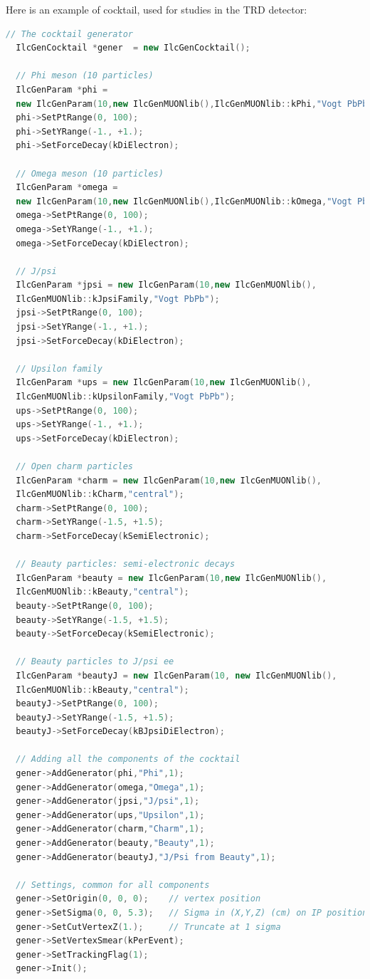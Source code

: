 \documentclass[12pt,a4paper,twoside]{article}
\begin{document}
Here is an example of cocktail, used for studies in the TRD detector:

\begin{lstlisting}[language=C++]
  // The cocktail generator
  IlcGenCocktail *gener  = new IlcGenCocktail();
  
  // Phi meson (10 particles)
  IlcGenParam *phi = 
  new IlcGenParam(10,new IlcGenMUONlib(),IlcGenMUONlib::kPhi,"Vogt PbPb");
  phi->SetPtRange(0, 100);
  phi->SetYRange(-1., +1.);
  phi->SetForceDecay(kDiElectron);

  // Omega meson (10 particles)
  IlcGenParam *omega = 
  new IlcGenParam(10,new IlcGenMUONlib(),IlcGenMUONlib::kOmega,"Vogt PbPb");
  omega->SetPtRange(0, 100);
  omega->SetYRange(-1., +1.);
  omega->SetForceDecay(kDiElectron);
  
  // J/psi 
  IlcGenParam *jpsi = new IlcGenParam(10,new IlcGenMUONlib(),
  IlcGenMUONlib::kJpsiFamily,"Vogt PbPb");
  jpsi->SetPtRange(0, 100);
  jpsi->SetYRange(-1., +1.);
  jpsi->SetForceDecay(kDiElectron);

  // Upsilon family
  IlcGenParam *ups = new IlcGenParam(10,new IlcGenMUONlib(),
  IlcGenMUONlib::kUpsilonFamily,"Vogt PbPb");
  ups->SetPtRange(0, 100);
  ups->SetYRange(-1., +1.);
  ups->SetForceDecay(kDiElectron);
  
  // Open charm particles
  IlcGenParam *charm = new IlcGenParam(10,new IlcGenMUONlib(), 
  IlcGenMUONlib::kCharm,"central");
  charm->SetPtRange(0, 100);
  charm->SetYRange(-1.5, +1.5);
  charm->SetForceDecay(kSemiElectronic);

  // Beauty particles: semi-electronic decays
  IlcGenParam *beauty = new IlcGenParam(10,new IlcGenMUONlib(), 
  IlcGenMUONlib::kBeauty,"central");
  beauty->SetPtRange(0, 100);
  beauty->SetYRange(-1.5, +1.5);
  beauty->SetForceDecay(kSemiElectronic);

  // Beauty particles to J/psi ee
  IlcGenParam *beautyJ = new IlcGenParam(10, new IlcGenMUONlib(), 
  IlcGenMUONlib::kBeauty,"central");
  beautyJ->SetPtRange(0, 100);
  beautyJ->SetYRange(-1.5, +1.5);
  beautyJ->SetForceDecay(kBJpsiDiElectron);

  // Adding all the components of the cocktail
  gener->AddGenerator(phi,"Phi",1);
  gener->AddGenerator(omega,"Omega",1);
  gener->AddGenerator(jpsi,"J/psi",1);
  gener->AddGenerator(ups,"Upsilon",1);
  gener->AddGenerator(charm,"Charm",1);
  gener->AddGenerator(beauty,"Beauty",1);
  gener->AddGenerator(beautyJ,"J/Psi from Beauty",1);

  // Settings, common for all components
  gener->SetOrigin(0, 0, 0);    // vertex position
  gener->SetSigma(0, 0, 5.3);   // Sigma in (X,Y,Z) (cm) on IP position
  gener->SetCutVertexZ(1.);     // Truncate at 1 sigma
  gener->SetVertexSmear(kPerEvent); 
  gener->SetTrackingFlag(1);
  gener->Init();
\end{lstlisting}
\end{document}
